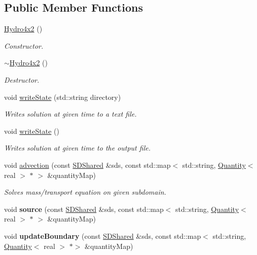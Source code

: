 \subsection*{Public Member Functions}
\begin{DoxyCompactItemize}
\item 
\mbox{\label{classHydro4x2_aa5e8d10e69425958918e655827a30cc6}} 
\mbox{\hyperlink{classHydro4x2_aa5e8d10e69425958918e655827a30cc6}{Hydro4x2}} ()
\begin{DoxyCompactList}\small\item\em Constructor. \end{DoxyCompactList}\item 
\mbox{\label{classHydro4x2_a28c0b40a8bf0d80c7c2487441fd4b85d}} 
\mbox{\hyperlink{classHydro4x2_a28c0b40a8bf0d80c7c2487441fd4b85d}{$\sim$\+Hydro4x2}} ()
\begin{DoxyCompactList}\small\item\em Destructor. \end{DoxyCompactList}\item 
void \mbox{\hyperlink{classHydro4x2_a9c39291599196f2e3ff57bd416488edb}{write\+State}} (std\+::string directory)
\begin{DoxyCompactList}\small\item\em Writes solution at given time to a text file. \end{DoxyCompactList}\item 
void \mbox{\hyperlink{classHydro4x2_ab1e5cb653e1f2bfc2965b80581bb0b86}{write\+State}} ()
\begin{DoxyCompactList}\small\item\em Writes solution at given time to the output file. \end{DoxyCompactList}\item 
void \mbox{\hyperlink{classHydro4x2_a9a6b67fe9d9ce8319bce856d99b2829e}{advection}} (const \mbox{\hyperlink{classSDShared}{S\+D\+Shared}} \&sds, const std\+::map$<$ std\+::string, \mbox{\hyperlink{classQuantity}{Quantity}}$<$ real $>$ $\ast$ $>$ \&quantity\+Map)
\begin{DoxyCompactList}\small\item\em Solves mass/transport equation on given subdomain. \end{DoxyCompactList}\item 
\mbox{\label{classHydro4x2_a4cd8964e02eecdcc1492461fb29c0f4c}} 
void {\bfseries source} (const \mbox{\hyperlink{classSDShared}{S\+D\+Shared}} \&sds, const std\+::map$<$ std\+::string, \mbox{\hyperlink{classQuantity}{Quantity}}$<$ real $>$ $\ast$ $>$ \&quantity\+Map)
\item 
\mbox{\label{classHydro4x2_afc7c8986f59a9595a3cef26e818a6d52}} 
void {\bfseries update\+Boundary} (const \mbox{\hyperlink{classSDShared}{S\+D\+Shared}} \&sds, const std\+::map$<$ std\+::string, \mbox{\hyperlink{classQuantity}{Quantity}}$<$ real $>$ $\ast$$>$ \&quantity\+Map)
\end{DoxyCompactItemize}
